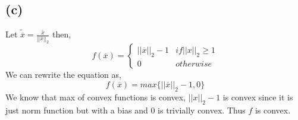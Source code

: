 \documentclass{article}
\begin{document}
\subsection*{(c)}
Let $\tilde{\overline{x}} = \frac{\overline{x}}{||\overline{x}||_2}$ then,
\begin{equation*}
	f(\overline{x}) = \begin{cases}
	||\overline{x}||_2 - 1 & if||x||_2 \ge 1\\
	0 & otherwise
	\end{cases}
\end{equation*}
We can rewrite the equation as,
\begin{equation*}
	f(\overline{x}) = max\{||\overline{x}||_2 - 1, 0\}
\end{equation*}
We know that max of convex functions is convex, $||x||_2-1$ is convex since it is just norm function but with a bias and 0 is trivially convex. Thus $f$ is convex.
\end{document}
